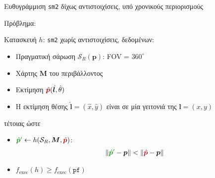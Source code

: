 \begin{frame}{Ευθυγράμμιση \texttt{sm2} δίχως αντιστοιχίσεις, υπό χρονικούς περιορισμούς}




  Πρόβλημα:\\
  \vspace{0.5cm}

  Κατασκευή $h$: \texttt{sm2} χωρίς αντιστοιχίσεις, δεδομένων:
  \begin{itemize}
    \item Πραγματική σάρωση $\mathcal{S}_R(\bm{p})$: FOV = $360^\circ$
    \item Χάρτης $\bm{M}$ του περιβάλλοντος
    \item Εκτίμηση $\textcolor{r}{\hat{\bm{p}}}(\hat{\bm{l}}, \hat{\theta})$
    \item Η εκτίμηση θέσης $\hat{\bm{l}} = (\hat{x},\hat{y})$ είναι σε μία γειτονιά της $\bm{l} = (x,y)$
  \end{itemize}

  \vspace{0.5cm}
  τέτοιας ώστε
  \begin{itemize}
    \item $\textcolor{g}{\hat{\bm{p}}^\prime} \leftarrow h(\mathcal{S}_R, \bm{M}, \textcolor{r}{\hat{\bm{p}}})$:
          \begin{align}
            \|\textcolor{g}{\hat{\bm{p}}^\prime} - \bm{p}\| < \|\textcolor{r}{\hat{\bm{p}}} - \bm{p}\| \nonumber
          \end{align}
    \item $f_{\text{exec}}(h) \geq f_{\text{exec}}(\texttt{pf})$
  \end{itemize}






\end{frame}
